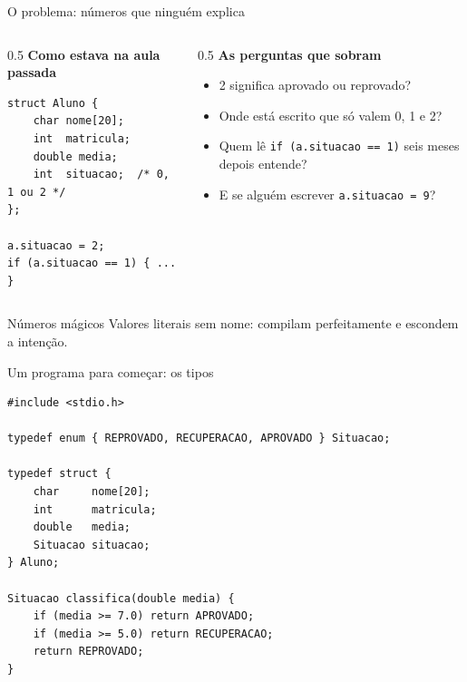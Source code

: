 \documentclass[aspectratio=169]{beamer}
\begin{document}
\begin{frame}[fragile]{O problema: números que ninguém explica}
\begin{columns}[T]
\begin{column}{0.5\textwidth}
\textbf{Como estava na aula passada}
\begin{lstlisting}[basicstyle=\ttfamily\scriptsize]
struct Aluno {
    char nome[20];
    int  matricula;
    double media;
    int  situacao;  /* 0, 1 ou 2 */
};

a.situacao = 2;
if (a.situacao == 1) { ... }
\end{lstlisting}
\end{column}
\begin{column}{0.5\textwidth}
\textbf{As perguntas que sobram}
\begin{itemize}
  \item 2 significa aprovado ou reprovado?
  \item Onde está escrito que só valem 0, 1 e 2?
  \item Quem lê \texttt{if (a.situacao == 1)} seis meses depois entende?
  \item E se alguém escrever \texttt{a.situacao = 9}?
\end{itemize}
\end{column}
\end{columns}
  \begin{alertblock}{Números mágicos}
    Valores literais sem nome: compilam perfeitamente e escondem a intenção.
  \end{alertblock}
\end{frame}

\begin{frame}[fragile]{Um programa para começar: os tipos}
\begin{lstlisting}[basicstyle=\ttfamily\scriptsize]
#include <stdio.h>

typedef enum { REPROVADO, RECUPERACAO, APROVADO } Situacao;

typedef struct {
    char     nome[20];
    int      matricula;
    double   media;
    Situacao situacao;
} Aluno;

Situacao classifica(double media) {
    if (media >= 7.0) return APROVADO;
    if (media >= 5.0) return RECUPERACAO;
    return REPROVADO;
}
\end{lstlisting}
\end{frame}
\end{document}
